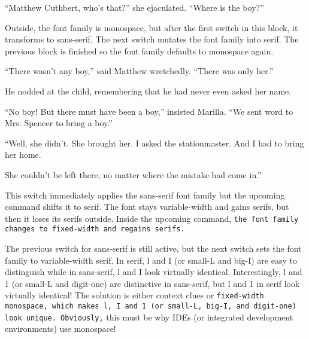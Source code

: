 \documentclass[a4paper]{article}
\begin{document}
``Matthew Cuthbert, who's that?'' she ejaculated. ``Where is the boy?''


{Outside, the font family is monospace, \sffamily but after the first switch in this block, it transforms to sans-serif. \rmfamily The next switch mutates the font family into serif.} The previous block is finished so the font family defaults to monospace again.

{``There wasn't any boy,'' said Matthew wretchedly. \rmfamily``There was only her.''

He nodded at the child, remembering that he had never even asked her name.

``No boy! \sffamily But there must have been a boy,'' insisted Marilla. ``We sent word to Mrs. Spencer to bring a boy.''

``Well, she didn't. She brought her. I asked the stationmaster. And I had to bring her home.} She couldn't be left there, no matter where the mistake had come in.''

\sffamily This switch immediately applies the sans-serif font family but the upcoming command \textrm{shifts it to serif. The font stays variable-width and gains serifs,} but then it loses its serifs outside. Inside the upcoming command, \texttt{the font family changes to fixed-width and regains serifs.}

The previous switch for sans-serif is still active, but the next switch \rmfamily sets the font family to variable-width serif. In serif, l and I (or small-L and big-I) are easy to distinguish while \textsf{in sans-serif, l and I look virtually identical. Interestingly, l and 1 (or small-L and digit-one) are distinctive in sans-serif,} but l and 1 in serif look virtually identical! The solution is either context clues or \texttt{fixed-width monospace, which makes l, I and 1 (or small-L, big-I, and digit-one) look unique. Obviously,} this must be why IDEs (or integrated development environments) use monospace!
\end{document}
